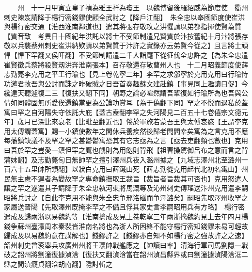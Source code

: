 　　州　十一月甲寅立皇子禎為雅王祥為瓊王　以魏博留後羅紹威為節度使　衢州刺史陳岌請降于楊行密錢鏐使顧全武討之【降戶江翻】　朱全忠以奉國節度使崔洪與楊行密交通【淮西淮南鄰道也】遣其將張存敬攻之洪懼請以弟都指揮使賢為質【質音致　考異日十國紀年洪託以將士不受節制遣兄賢質於汴按舊紀十月汴將張存敬以兵襲蔡州刺史崔洪納欵請以弟賢質于汴許之實錄亦云弟賢今從之】且言將士頑悍【悍下罕翻又侯旰翻】不受節制請遣二千人詣麾下從征伐全忠許之【為朱全忠遣崔賢徵兵蔡將殺賢刼洪奔淮南張本】召存敬還存敬曹州人也　十二月昭義節度使薛志勤薨李克用之平王行瑜也【見上卷乾寧二年】李罕之求邠寧於克用克用曰行瑜恃功邀君故吾與公討而誅之昨破賊之日吾首奏趣蘇文建赴鎮【事見同上趣讀曰促】今纔達天聽遽復二三【復扶又翻下同】朝野之論必喧然謂吾輩復如行瑜所為也吾與公情如同體固無所愛俟還鎮當更為公論功賞耳【為于偽翻下同】罕之不悦而退私於蓋寓曰罕之自河陽失守依託大庇【蓋古盍翻李罕之失河陽見二百五十七卷僖宗文德元年】歲月已深比來衰老【比毗至翻近也】倦於軍旅若蒙吾王與太傅哀愍【王謂李克用太傳謂蓋寓】賜一小鎮使數年之間休兵養疾然後歸老閭閻幸矣寓為之言克用不應每藩鎮缺議不及罕之罕之甚鬱鬱寓恐其有它志亟為之言【亟去吏翻頻也數也】克用曰吾於罕之豈愛一鎮但罕之鷹也饑則為用飽則背飛【祖曹操駕御呂布之意而言之背蒲妹翻】及志勤薨旬日無帥罕之擅引澤州兵夜入潞州據之【九域志澤州北至潞州一百六十五里帥所類翻】以狀白克用曰薛鐵山死【薛志勤從克用起代北初名鐵山】州民無主慮不逞者為變故罕之專命鎮撫取王裁旨【裁旨者旨裁其可否也】克用怒遣人讓之罕之遂遣其子請降于朱全忠執河東將馬溉等及沁州刺史傅瑤送汴州克用遣李嗣昭將兵討之【自此李克用不能與朱全忠争邢洺磁而争澤潞矣】嗣昭先取澤州收罕之家屬送晉陽【先取澤州既掩李罕之不備且俘其家史言李嗣昭用兵有方略】　楊行密遣成及歸兩浙以易魏約等【淮南擒成及見上卷乾寧三年兩浙擒魏約見上去年四月楊錢争蘇州臺濛周本秦裴皆淮南名將也為浙人所困終不能守楊行密知錢鏐未易可輕故歸成及以易魏約意在講解也】錢鏐許之【錢鏐亦自知不如楊行密之強故許之之速】　韶州刺史曾衮舉兵攻廣州州將王瓌帥戰艦應之【帥讀曰率】清海行軍司馬劉隱一戰破之韶州將劉潼復據湞浛【復扶又翻湞浛當在韶州湞昌縣界或曰劉潼據湞陽浛洭二縣之間湞癡貞翻浛胡南翻】隱討斬之

